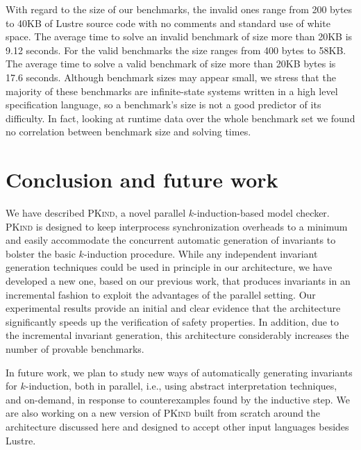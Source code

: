 \documentclass[submission,copyright,creativecommons]{eptcs}
\newcommand{\PKind}{\textrm{\textsc{PKind}}\xspace}
\begin{document}
With regard to the size of our benchmarks, 
the invalid ones range from 200 bytes to 40KB 
of Lustre source code with no comments and standard use of white space.  
The average time to solve an invalid
benchmark of size more than 20KB is 9.12 seconds.  For the valid
benchmarks the size ranges from 400 bytes to 58KB. The average time
to solve a valid benchmark of size more than 20KB bytes is 17.6
seconds. 
Although benchmark sizes may appear small,
we stress that
the majority of these benchmarks are infinite-state systems written in
a high level specification language, so a benchmark's size is not a
good predictor of its difficulty. In fact, looking at runtime data
over the whole benchmark set we found no correlation between benchmark
size and solving times.


\vspace{-0.5cm}

\section{Conclusion and future work}

We have described \PKind, a novel parallel
$k$-induction-based model checker. \PKind is designed to keep
interprocess synchronization overheads to a minimum and easily
accommodate the concurrent automatic generation of invariants 
to bolster the basic $k$-induction procedure.  
While any independent invariant generation techniques 
could be used in principle in our architecture, we have
developed a new one, based on our previous work, that produces
invariants in an incremental fashion to exploit the advantages of the
parallel setting.  
Our experimental results provide an initial and
clear evidence that
the architecture significantly speeds up the verification of safety
properties. In addition, due to the incremental invariant generation, this architecture
considerably increases the number of provable benchmarks.

In future work, we plan to study new ways of automatically generating
invariants for $k$-induction,
both in parallel, i.e., using abstract interpretation techniques,
and on-demand, in response to counterexamples found by the inductive step.
We are also working on a new version of \PKind built from scratch
around the architecture discussed here and 
designed to accept other input languages besides Lustre.


\nocite{*}


\end{document}
